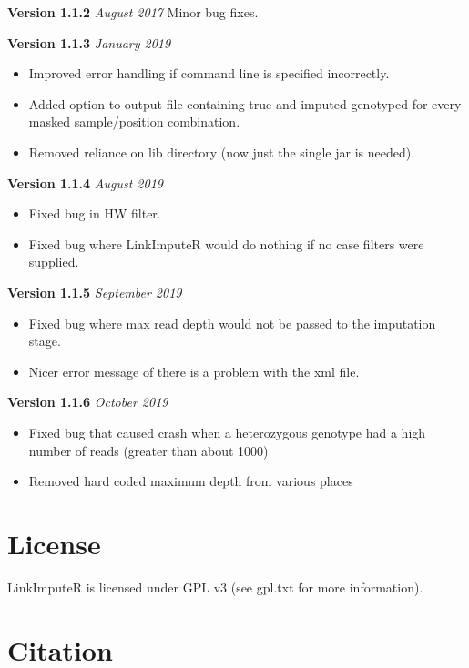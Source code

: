 \documentclass[10pt]{report}
\begin{document}
\textbf{Version 1.1.2} \textit{August 2017} Minor bug fixes.

\textbf{Version 1.1.3} \textit{January 2019}
\begin{itemize}
    \item Improved error handling if command line is specified incorrectly.
    \item Added option to output file containing true and imputed genotyped for every masked sample/position combination.
    \item Removed reliance on lib directory (now just the single jar is needed).
\end{itemize}

\textbf{Version 1.1.4} \textit{August 2019}
\begin{itemize}
    \item Fixed bug in HW filter.
    \item Fixed bug where LinkImputeR would do nothing if no case filters were supplied.
\end{itemize}

\textbf{Version 1.1.5} \textit{September 2019}
\begin{itemize}
    \item Fixed bug where max read depth would not be passed to the imputation stage.
    \item Nicer error message of there is a problem with the xml file.
\end{itemize}

\textbf{Version 1.1.6} \textit{October 2019}
\begin{itemize}
    \item Fixed bug that caused crash when a heterozygous genotype had a high number of reads (greater than about 1000)
    \item Removed hard coded maximum depth from various places
\end{itemize}



\section{License}

LinkImputeR is licensed under GPL v3 (see gpl.txt for more information).

\section{Citation}
\end{document}
